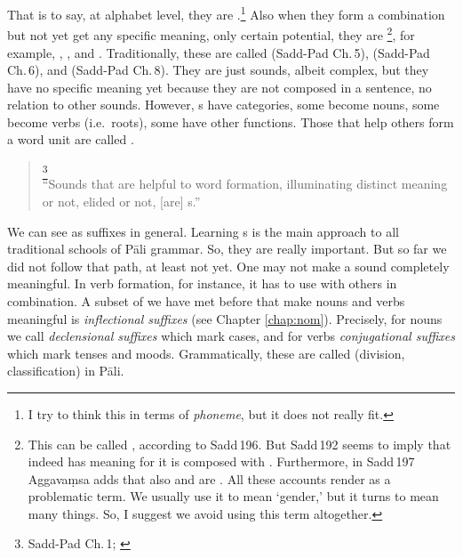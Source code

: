 That is to say, at alphabet level, they are .\footnote{I try to think this in terms of \emph{phoneme}, but it does not really fit.} Also when they form a combination but not yet get any specific meaning, only certain potential, they are \footnote{This can be called , according to Sadd\,196. But Sadd\,192 seems to imply that  indeed has meaning for it is composed with . Furthermore, in Sadd\,197 Aggava\d msa adds that also  and  are . All these accounts render  as a problematic term. We usually use it to mean `gender,' but it turns to mean many things. So, I suggest we avoid using this term altogether.}, for example, , , and . Traditionally, these are called  (Sadd-Pad Ch.\,5),  (Sadd-Pad Ch.\,6), and  (Sadd-Pad Ch.\,8). They are just sounds, albeit complex, but they have no specific meaning yet because they are not composed in a sentence, no relation to other sounds. However, s have categories, some become nouns, some become verbs (i.e.\ roots), some have other functions. Those that help others  form a word unit are called .

\begin{quote}
\footnote{Sadd-Pad Ch.\,1; \citealp[p.~3]{smith:sadd1}}\\
``Sounds that are helpful to word formation, illuminating distinct meaning or not, elided or not, [are] s.''
\end{quote}

We can see  as suffixes in general. Learning s is the main approach to all traditional schools of P\=ali grammar. So, they are really important. But so far we did not follow that path, at least not yet. One  may not make a sound completely meaningful. In verb formation, for instance, it has to use with others in combination. A subset of  we have met before that make nouns and verbs meaningful is \emph{inflectional suffixes} (see Chapter \ref{chap:nom}). Precisely, for nouns we call \emph{declensional suffixes} which mark cases, and for verbs \emph{conjugational suffixes} which mark tenses and moods. Grammatically, these are called  (division, classification) in P\=ali.

